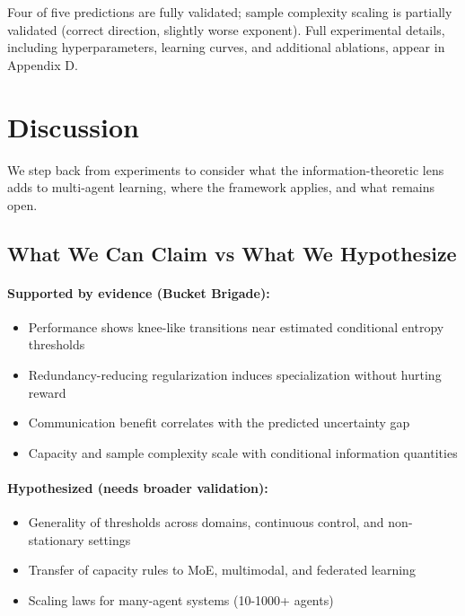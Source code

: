 \documentclass[10pt, letterpaper]{article}
\begin{document}
Four of five predictions are fully validated; sample complexity scaling is partially validated (correct direction, slightly worse exponent). Full experimental details, including hyperparameters, learning curves, and additional ablations, appear in Appendix D.

\section{Discussion}
\label{sec:discussion}

We step back from experiments to consider what the information-theoretic lens adds to multi-agent learning, where the framework applies, and what remains open.

\subsection{What We Can Claim vs What We Hypothesize}

\paragraph{Supported by evidence (Bucket Brigade):}
\begin{itemize}
    \item Performance shows knee-like transitions near estimated conditional entropy thresholds
    \item Redundancy-reducing regularization induces specialization without hurting reward
    \item Communication benefit correlates with the predicted uncertainty gap
    \item Capacity and sample complexity scale with conditional information quantities
\end{itemize}

\paragraph{Hypothesized (needs broader validation):}
\begin{itemize}
    \item Generality of thresholds across domains, continuous control, and non-stationary settings
    \item Transfer of capacity rules to MoE, multimodal, and federated learning
    \item Scaling laws for many-agent systems (10-1000+ agents)
\end{itemize}
\end{document}
